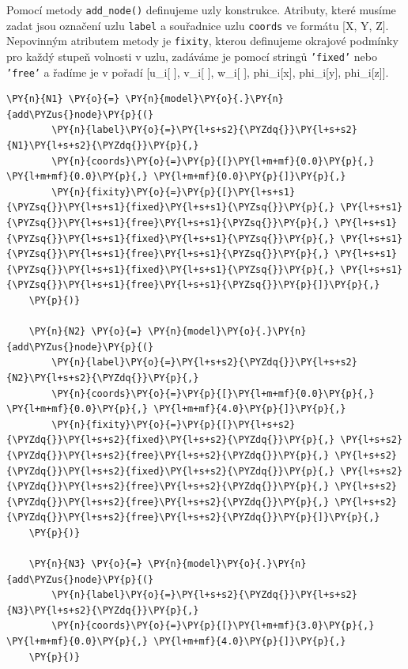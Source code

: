 Pomocí metody \texttt{add\_node()} definujeme uzly konstrukce. Atributy, které musíme zadat jsou označení uzlu \texttt{label} a souřadnice uzlu \texttt{coords} ve formátu [\gls{X}, \gls{Y}, \gls{Z}]. Nepovinným atributem metody je \texttt{fixity}, kterou definujeme okrajové podmínky pro každý stupeň volnosti v uzlu, zadáváme je pomocí stringů \texttt{'fixed'} nebo \texttt{'free'} a řadíme je v pořadí [\gls{u_i}[ ], \gls{v_i}[ ], \gls{w_i}[ ], \gls{phi_i}[\gls{x}], \gls{phi_i}[\gls{y}], \gls{phi_i}[\gls{z}]].
\begin{tcolorbox}[breakable, size=fbox, boxrule=1pt, pad at break*=1mm,colback=cellbackground, colframe=cellborder]
    \begin{Verbatim}[commandchars=\\\{\}]
    \PY{n}{N1} \PY{o}{=} \PY{n}{model}\PY{o}{.}\PY{n}{add\PYZus{}node}\PY{p}{(}
        \PY{n}{label}\PY{o}{=}\PY{l+s+s2}{\PYZdq{}}\PY{l+s+s2}{N1}\PY{l+s+s2}{\PYZdq{}}\PY{p}{,}
        \PY{n}{coords}\PY{o}{=}\PY{p}{[}\PY{l+m+mf}{0.0}\PY{p}{,} \PY{l+m+mf}{0.0}\PY{p}{,} \PY{l+m+mf}{0.0}\PY{p}{]}\PY{p}{,}
        \PY{n}{fixity}\PY{o}{=}\PY{p}{[}\PY{l+s+s1}{\PYZsq{}}\PY{l+s+s1}{fixed}\PY{l+s+s1}{\PYZsq{}}\PY{p}{,} \PY{l+s+s1}{\PYZsq{}}\PY{l+s+s1}{free}\PY{l+s+s1}{\PYZsq{}}\PY{p}{,} \PY{l+s+s1}{\PYZsq{}}\PY{l+s+s1}{fixed}\PY{l+s+s1}{\PYZsq{}}\PY{p}{,} \PY{l+s+s1}{\PYZsq{}}\PY{l+s+s1}{free}\PY{l+s+s1}{\PYZsq{}}\PY{p}{,} \PY{l+s+s1}{\PYZsq{}}\PY{l+s+s1}{fixed}\PY{l+s+s1}{\PYZsq{}}\PY{p}{,} \PY{l+s+s1}{\PYZsq{}}\PY{l+s+s1}{free}\PY{l+s+s1}{\PYZsq{}}\PY{p}{]}\PY{p}{,}
    \PY{p}{)}
    
    \PY{n}{N2} \PY{o}{=} \PY{n}{model}\PY{o}{.}\PY{n}{add\PYZus{}node}\PY{p}{(}
        \PY{n}{label}\PY{o}{=}\PY{l+s+s2}{\PYZdq{}}\PY{l+s+s2}{N2}\PY{l+s+s2}{\PYZdq{}}\PY{p}{,}
        \PY{n}{coords}\PY{o}{=}\PY{p}{[}\PY{l+m+mf}{0.0}\PY{p}{,} \PY{l+m+mf}{0.0}\PY{p}{,} \PY{l+m+mf}{4.0}\PY{p}{]}\PY{p}{,}
        \PY{n}{fixity}\PY{o}{=}\PY{p}{[}\PY{l+s+s2}{\PYZdq{}}\PY{l+s+s2}{fixed}\PY{l+s+s2}{\PYZdq{}}\PY{p}{,} \PY{l+s+s2}{\PYZdq{}}\PY{l+s+s2}{free}\PY{l+s+s2}{\PYZdq{}}\PY{p}{,} \PY{l+s+s2}{\PYZdq{}}\PY{l+s+s2}{fixed}\PY{l+s+s2}{\PYZdq{}}\PY{p}{,} \PY{l+s+s2}{\PYZdq{}}\PY{l+s+s2}{free}\PY{l+s+s2}{\PYZdq{}}\PY{p}{,} \PY{l+s+s2}{\PYZdq{}}\PY{l+s+s2}{free}\PY{l+s+s2}{\PYZdq{}}\PY{p}{,} \PY{l+s+s2}{\PYZdq{}}\PY{l+s+s2}{free}\PY{l+s+s2}{\PYZdq{}}\PY{p}{]}\PY{p}{,}
    \PY{p}{)}
    
    \PY{n}{N3} \PY{o}{=} \PY{n}{model}\PY{o}{.}\PY{n}{add\PYZus{}node}\PY{p}{(}
        \PY{n}{label}\PY{o}{=}\PY{l+s+s2}{\PYZdq{}}\PY{l+s+s2}{N3}\PY{l+s+s2}{\PYZdq{}}\PY{p}{,}
        \PY{n}{coords}\PY{o}{=}\PY{p}{[}\PY{l+m+mf}{3.0}\PY{p}{,} \PY{l+m+mf}{0.0}\PY{p}{,} \PY{l+m+mf}{4.0}\PY{p}{]}\PY{p}{,}
    \PY{p}{)}
    

\end{Verbatim}
\end{tcolorbox}
